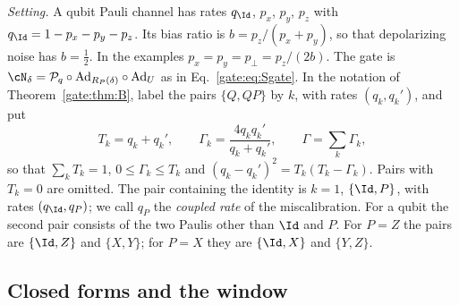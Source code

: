 \emph{Setting.} A qubit Pauli channel has rates $q_\Id$, $p_x$, $p_y$, $p_z$ with $q_\Id=1-p_x-p_y-p_z$. Its bias ratio is $b=p_z/(p_x+p_y)$, so that depolarizing noise has $b=\frac12$. In the examples $p_x=p_y=p_\perp=p_z/(2b)$. The gate is $\cN_\delta=\mathcal P_q\circ\mathrm{Ad}_{R_P(\delta)}\circ\mathrm{Ad}_U$ as in Eq.~\eqref{gate:eq:Sgate}. In the notation of Theorem~\ref{gate:thm:B}, label the pairs $\{Q,QP\}$ by $k$, with rates $(q_k,q_k')$, and put
\begin{equation}\label{gate:eq:Bpair}
T_k=q_k+q_k',\qquad \Gamma_k=\frac{4q_kq_k'}{q_k+q_k'},\qquad \Gamma=\sum_k\Gamma_k ,
\end{equation}
so that $\sum_kT_k=1$, $0\le\Gamma_k\le T_k$ and $(q_k-q_k')^2=T_k(T_k-\Gamma_k)$. Pairs with $T_k=0$ are omitted. The pair containing the identity is $k=1$, $\{\Id,P\}$, with rates $(q_\Id,q_P)$; we call $q_P$ the \emph{coupled rate} of the miscalibration. For a qubit the second pair consists of the two Paulis other than $\Id$ and $P$. For $P=Z$ the pairs are $\{\Id,Z\}$ and $\{X,Y\}$; for $P=X$ they are $\{\Id,X\}$ and $\{Y,Z\}$.

\subsection*{Closed forms and the window}


